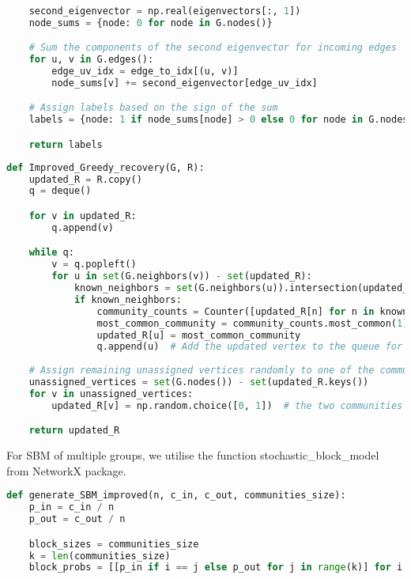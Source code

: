 \begin{appendices}
\begin{lstlisting}[language=Python, caption=Implementation of the Spectral Algorithm based on Non-Backtracking Matrix, label=code: spec_algo, numbers=none]
  
    second_eigenvector = np.real(eigenvectors[:, 1])
    node_sums = {node: 0 for node in G.nodes()}

    # Sum the components of the second eigenvector for incoming edges
    for u, v in G.edges():
        edge_uv_idx = edge_to_idx[(u, v)]
        node_sums[v] += second_eigenvector[edge_uv_idx]

    # Assign labels based on the sign of the sum
    labels = {node: 1 if node_sums[node] > 0 else 0 for node in G.nodes()}

    return labels
\end{lstlisting}
\vspace{10mm}
\begin{lstlisting}[language=Python, caption=Implementation of Greedy Recovery Algorithm , label=code: heur_greedy, numbers=none]
def Improved_Greedy_recovery(G, R):
    updated_R = R.copy()
    q = deque()

    for v in updated_R:
        q.append(v)

    while q:
        v = q.popleft()
        for u in set(G.neighbors(v)) - set(updated_R):
            known_neighbors = set(G.neighbors(u)).intersection(updated_R)
            if known_neighbors:
                community_counts = Counter([updated_R[n] for n in known_neighbors])
                most_common_community = community_counts.most_common(1)[0][0]
                updated_R[u] = most_common_community
                q.append(u)  # Add the updated vertex to the queue for further propagation
                
    # Assign remaining unassigned vertices randomly to one of the communities
    unassigned_vertices = set(G.nodes()) - set(updated_R.keys())
    for v in unassigned_vertices:
        updated_R[v] = np.random.choice([0, 1])  # the two communities labeled 0 and 1

    return updated_R
\end{lstlisting}
\vspace{10mm}
For SBM of multiple groups, we utilise the function stochastic\_block\_model from NetworkX package.
\begin{lstlisting}[language=Python, caption=Implementation of SBM for multiple groups, label=code: SBM_multi, numbers=none]
def generate_SBM_improved(n, c_in, c_out, communities_size):
    p_in = c_in / n
    p_out = c_out / n

    block_sizes = communities_size
    k = len(communities_size)
    block_probs = [[p_in if i == j else p_out for j in range(k)] for i in range(k)]
 

\end{lstlisting}
\end{appendices}
